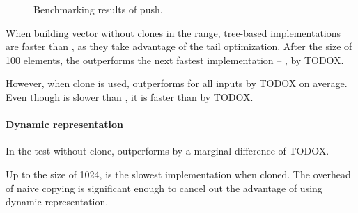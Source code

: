 \begin{figure}[!htbp]
\begin{adjustbox}{width=\textwidth}
    \end{adjustbox}
    
    \caption{Benchmarking results of push.}
    \label{fig:push}
\end{figure}

When building vector without clones in the \range{[10, 100]} range, tree-based implementations are faster than \stdvec{}, as they take advantage of the tail optimization. After the size of 100 elements, the \stdvec{} outperforms the next fastest implementation -- \pvec{}, by TODOX.

However, when clone is used, \rbvec{} outperforms \stdvec{} for all inputs by TODOX on average. Even though \imrsvec{} is slower than \rbvec{}, it is faster than \pvec{} by TODOX. 

\paragraph{Dynamic representation}
In the test without clone, \pvec{} outperforms \rbvec{} by a marginal difference of TODOX. 

Up to the size of 1024, \pvec{} is the slowest implementation when cloned. The overhead of naive copying is significant enough to cancel out the advantage of using dynamic representation.


